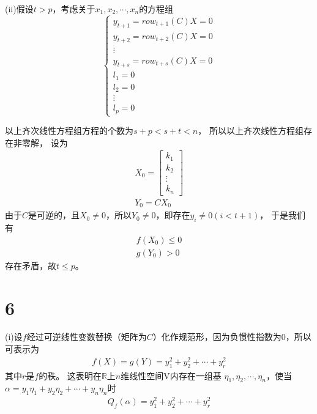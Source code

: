 \documentclass{article}
\begin{document}
(ii)假设$t > p$，考虑关于$x_1, x_2, \cdots, x_n$的方程组
\begin{equation*}
  \begin{cases}
    y_{t+1} = row_{t + 1}(C) X = 0 \\
    y_{t+2} = row_{t + 2}(C) X = 0 \\
    \vdots                         \\
    y_{t+s} = row_{t + s}(C) X = 0 \\
    l_{1} = 0                      \\
    l_{2} = 0                      \\
    \vdots                         \\
    l_{p} = 0
  \end{cases}
\end{equation*}

以上齐次线性方程组方程的个数为$s + p < s + t < n$，
所以以上齐次线性方程组存在非零解，
设为\begin{align*}
  X_0 = \begin{bmatrix}
          k_1    \\
          k_2    \\
          \vdots \\
          k_n
        \end{bmatrix} \\
  Y_0 = C X_0
\end{align*}
由于$C$是可逆的，且$X_0 \neq 0$，所以$Y_0 \neq 0$，即存在$y_i \neq 0 (i < t+1)$，
于是我们有
\begin{align*}
  f(X_0) \leq 0 \\
  g(Y_0) > 0
\end{align*}
存在矛盾，故$t \leq p$。

\section*{6}

 (i)设$f$经过可逆线性变数替换（矩阵为$C$）化作规范形，因为负惯性指数为0，所以可表示为
\begin{align*}
  f(X) = g(Y) = y_1^2 + y_2^2 + \cdots + y_r^2
\end{align*}
其中$r$是$f$的秩。
这表明在$\mathbb{R}$上$n$维线性空间V内存在一组基
$\eta_1, \eta_2, \cdots, \eta_n$，使当$\alpha = y_1 \eta_1 + y_2 \eta_2 + \cdots + y_n \eta_n$时
\begin{align*}
  Q_f(\alpha) = y_1^2 + y_2^2 + \cdots + y_r^2
\end{align*}
\end{document}
